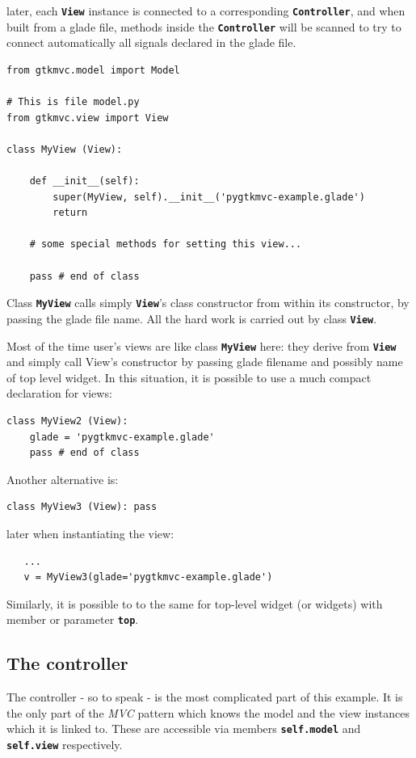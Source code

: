 \documentclass{article}
\newcommand{\kw}[1]{\emph{#1}\xspace}
\newcommand{\mvc}{\kw{MVC} pattern\xspace}
\newcommand{\codename}[1]{\texttt{\bfseries \textcolor {codecolor}{#1}}\xspace}
\newcommand{\codesize}{\small } %
\begin{document}
later, each \codename{View} instance is connected to a
corresponding \codename{Controller}, and when built from a glade file,
methods inside the \codename{Controller} will be scanned to try to
connect automatically all signals declared in the glade file.

{ \codesize 
\begin{verbatim}   
from gtkmvc.model import Model
  
# This is file model.py
from gtkmvc.view import View

class MyView (View):

    def __init__(self):
        super(MyView, self).__init__('pygtkmvc-example.glade')
        return

    # some special methods for setting this view...

    pass # end of class
\end{verbatim}
}

Class \codename{MyView} calls simply \codename{View}'s class
constructor from within its constructor, by passing the glade file
name. All the hard work is carried out by class \codename{View}.

Most of the time user's views are like class \codename{MyView}
here: they derive from \codename{View} and simply call View's
constructor by passing glade filename and possibly name of top
level widget. In this situation, it is possible to use a much
compact declaration for views:

{ \codesize 
\begin{verbatim}   
class MyView2 (View):
    glade = 'pygtkmvc-example.glade'
    pass # end of class
\end{verbatim}
}

Another alternative is:

{ \codesize 
\begin{verbatim}   
class MyView3 (View): pass
\end{verbatim}
}

later when instantiating the view:
{ \codesize 
\begin{verbatim}   
   ...
   v = MyView3(glade='pygtkmvc-example.glade')
\end{verbatim}
}

Similarly, it is possible to to the same for top-level widget (or
widgets) with member or parameter \codename{top}.


\subsection{The controller}
The controller - so to speak - is the most complicated part of this
example. It is the only part of the \mvc which knows the model and the
view instances which it is linked to. These are accessible via members
\codename{self.model} and \codename{self.view} respectively.
  
\end{document}
